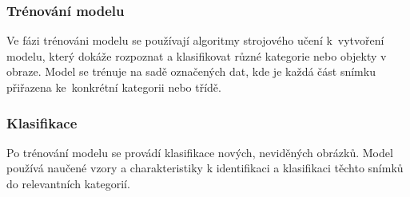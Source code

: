 \subsubsection{Trénování modelu}
Ve fázi trénováni modelu se používají algoritmy strojového učení k~vytvoření modelu, který dokáže rozpoznat a klasifikovat různé kategorie nebo objekty v obraze. Model se trénuje na sadě označených dat, kde je každá část snímku přiřazena ke~konkrétní kategorii nebo třídě.

\subsubsection{Klasifikace}
Po trénování modelu se provádí klasifikace nových, neviděných obrázků. Model používá naučené vzory a charakteristiky k identifikaci a klasifikaci těchto snímků do relevantních kategorií. \cite{zhang2016}
